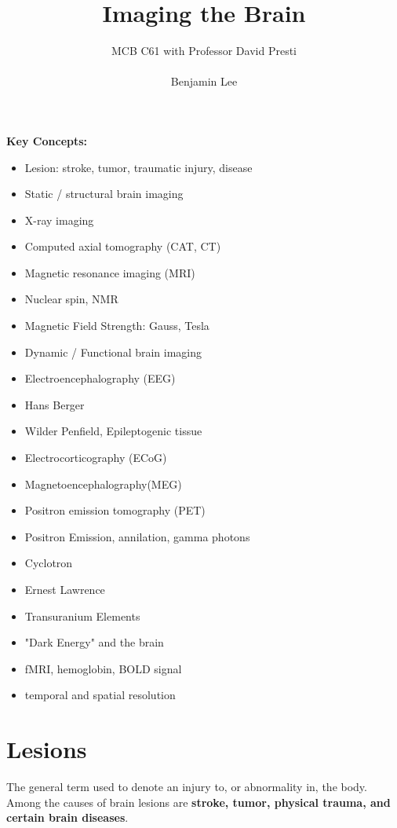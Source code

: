 \documentclass{article}
\title{Imaging the Brain}
\author{MCB C61 with Professor David Presti \\ \\ Benjamin Lee}
\begin{document}
\maketitle

\textbf{Key Concepts:}
\begin{itemize}
    \item Lesion: stroke, tumor, traumatic injury, disease
    \item Static / structural brain imaging
    \item X-ray imaging
    \item Computed axial tomography (CAT, CT)
    \item Magnetic resonance imaging (MRI)
    \item Nuclear spin, NMR
    \item Magnetic Field Strength: Gauss, Tesla
    \item Dynamic / Functional brain imaging
    \item Electroencephalography (EEG)
    \item Hans Berger
    \item Wilder Penfield, Epileptogenic tissue
    \item Electrocorticography (ECoG) 
    \item Magnetoencephalography(MEG) 
    \item Positron emission tomography (PET) 
    \item Positron Emission, annilation, gamma photons
    \item Cyclotron
    \item Ernest Lawrence
    \item Transuranium Elements
    \item "Dark Energy" and the brain
    \item fMRI, hemoglobin, BOLD signal
    \item temporal and spatial resolution
\end{itemize}

\newpage

\section{Lesions}

The general term used to denote an injury to, or abnormality in, the body. \\

Among the causes of brain lesions are \textbf{stroke, tumor, physical trauma, and certain brain diseases}. \\
\end{document}
